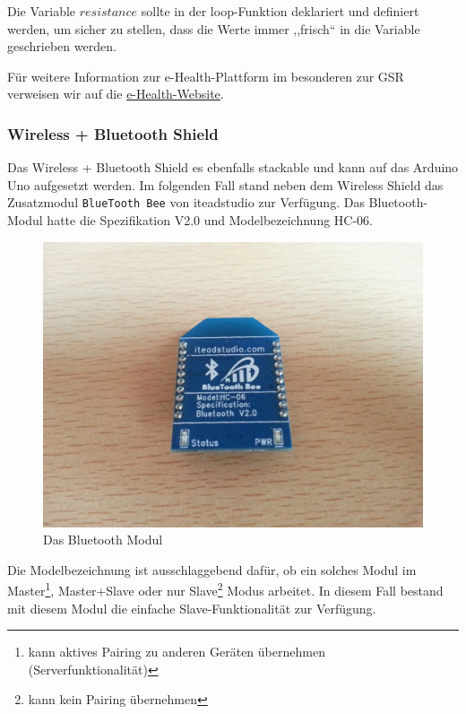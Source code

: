 \documentclass[10pt, a4paper, oneside, titlepage]{scrartcl} %
\begin{document}
	 Die Variable $resistance$ sollte in der loop-Funktion deklariert und definiert werden, um sicher zu stellen, dass die Werte immer ,,frisch`` in die Variable geschrieben werden.
	 
	 Für weitere Information zur e-Health-Plattform im besonderen zur GSR verweisen wir auf die \href{http://www.cooking-hacks.com/documentation/tutorials/ehealth-biometric-sensor-platform-arduino-raspberry-pi-medical\#step4\_7}{e-Health-Website}.
	
	\subsubsection{Wireless + Bluetooth Shield}
	
	Das Wireless + Bluetooth Shield es ebenfalls stackable und kann auf das Arduino Uno aufgesetzt werden. 
	Im folgenden Fall stand neben dem Wireless Shield das Zusatzmodul \texttt{BlueTooth Bee} von iteadstudio zur Verfügung. Das Bluetooth-Modul hatte die Spezifikation V2.0 und Modelbezeichnung HC-06. 
	
		\begin{figure}[hbtp]
		\centering
		\includegraphics[scale=0.1]{img/Bluetooth-Modul.jpg}
		\caption{Das Bluetooth Modul}
		\label{fig:Bluetooth-Modul}
		\end{figure}
		
	
	Die Modelbezeichnung ist ausschlaggebend dafür, ob ein solches Modul im Master\footnote{kann aktives Pairing zu anderen Geräten übernehmen (Serverfunktionalität)}, Master+Slave oder nur Slave\footnote{kann kein Pairing übernehmen} Modus arbeitet. In diesem Fall bestand mit diesem Modul die einfache Slave-Funktionalität zur Verfügung.
	
\end{document}
